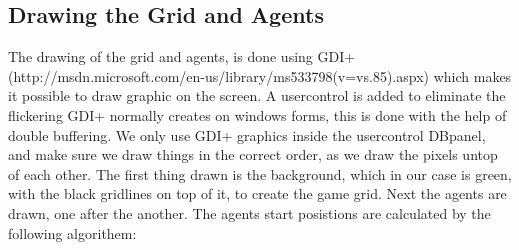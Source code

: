\subsection*{Drawing the Grid and Agents}
\label{sec:drawing}
The drawing of the grid and agents, is done using GDI+ (http://msdn.microsoft.com/en-us/library/ms533798(v=vs.85).aspx) which makes it possible to draw graphic on the screen. A usercontrol is added to eliminate the flickering GDI+ normally creates on windows forms, this is done with the help of double buffering.
We only use GDI+ graphics inside the usercontrol DBpanel, and make sure we draw things in the correct order, as we draw the pixels untop of each other. The first thing drawn is the background, which in our case is green, with the black gridlines on top of it, to create the game grid. Next the agents are drawn, one after the another.
The agents start posistions are calculated by the following algorithem: